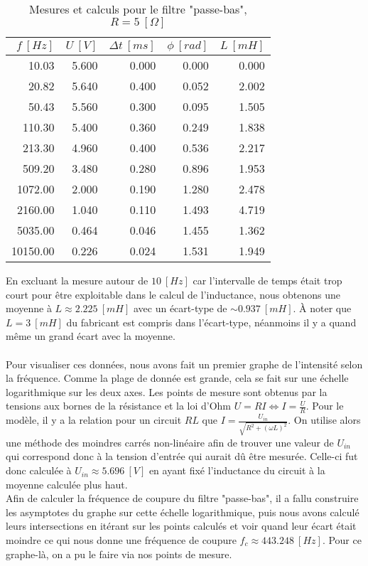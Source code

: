 \begin{table}[H]
\centering
\begin{tabular}{rrrrr}
\toprule
 $f \ [Hz]$ &  $U \ [V]$ &  $\Delta t \ [ms]$ &  $\phi \ [rad]$ &  $L \ [mH]$ \\
\midrule
     10.03 &        5.600 &       0.000 &  0.000 &            0.000 \\
     20.82 &        5.640 &       0.400 &  0.052 &            2.002 \\
     50.43 &        5.560 &       0.300 &  0.095 &            1.505 \\
    110.30 &        5.400 &       0.360 &  0.249 &            1.838 \\
    213.30 &        4.960 &       0.400 &  0.536 &            2.217 \\
    509.20 &        3.480 &       0.280 &  0.896 &            1.953 \\
   1072.00 &        2.000 &       0.190 &  1.280 &            2.478 \\
   2160.00 &        1.040 &       0.110 &  1.493 &            4.719 \\
   5035.00 &        0.464 &       0.046 &  1.455 &            1.362 \\
  10150.00 &        0.226 &       0.024 &  1.531 &            1.949 \\
\bottomrule
\end{tabular}
\caption{Mesures et calculs pour le filtre "passe-bas", $R = 5 \ [ \Omega ]$}
\label{tab:p-b-5}
\end{table}

En excluant la mesure autour de $10 \ [Hz]$ car l'intervalle de temps était trop court pour être exploitable dans le calcul de l'inductance, nous obtenons une moyenne à $L \approx 2.225 \ [mH]$ avec un écart-type de $\sim 0.937 \ [mH]$. À noter que $L = 3 \ [mH]$ du fabricant est compris dans l'écart-type, néanmoins il y a quand même un grand écart avec la moyenne.\\ \\
Pour visualiser ces données, nous avons fait un premier graphe de l'intensité selon la fréquence. Comme la plage de donnée est grande, cela se fait sur une échelle logarithmique sur les deux axes. Les points de mesure sont obtenus par la tensions aux bornes de la résistance et la loi d'Ohm $U = RI \Leftrightarrow I = \frac{U}{R}$. Pour le modèle, il y a la relation pour un circuit $RL$ que $I = \frac{U_{in}}{\sqrt{R^2 + (\omega L)^2}}$. On utilise alors une méthode des moindres carrés non-linéaire afin de trouver une valeur de $U_{in}$ qui correspond donc à la tension d'entrée qui aurait dû être mesurée. Celle-ci fut  donc calculée à $U_{in} \approx 5.696 \ [V]$ en ayant fixé l'inductance du circuit à la moyenne calculée plus haut.\\
Afin de calculer la fréquence de coupure du filtre "passe-bas", il a fallu construire les asymptotes du graphe sur cette échelle logarithmique, puis nous avons calculé leurs intersections en itérant sur les points calculés et voir quand leur écart était moindre ce qui nous donne une fréquence de coupure $f_c \approx 443.248 \ [Hz]$. Pour ce graphe-là, on a pu le faire via nos points de mesure.\\

